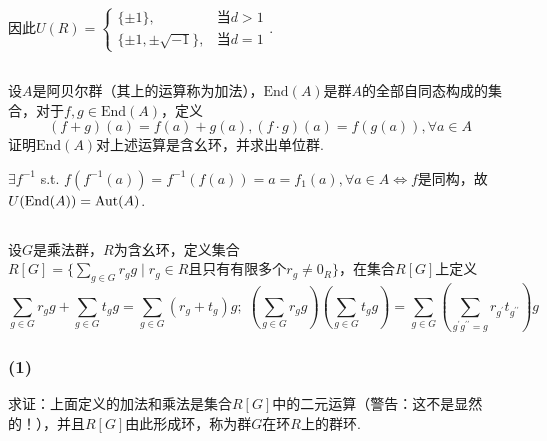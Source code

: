 因此$U(R)=
\begin{cases}
\{\pm 1\}, & \text{当}d>1\\
\{\pm 1, \pm\sqrt{-1}\}, & \text{当}d=1
\end{cases}$.

\subsection{}
设$A$是阿贝尔群（其上的运算称为加法），$\mathrm{End}(A)$是群$A$的全部自同态构成的集合，对于$f,g\in\mathrm{End}(A)$，定义
$$(f+g)(a)=f(a)+g(a), (f\cdot g)(a)=f(g(a)), \forall a\in A$$
证明$\mathrm{End}(A)$对上述运算是含幺环，并求出单位群.


\jie $\exists f^{-1}$ s.t. $f(f^{-1}(a))=f^{-1}(f(a))=a=f_1(a), \forall a\in A\Leftrightarrow
f$是同构，故$U(\mathrm{End}(A))=\operatorname{Aut}(A)$.

\subsection{}
设$G$是乘法群，$R$为含幺环，定义集合$R[G]=\{\sum_{g\in G}r_gg\mid r_g\in R\text{且只有有限多个}r_g\neq 0_R\}$，在集合$R[G]$上定义
$$\sum_{g\in G}r_gg+\sum_{g\in G}t_gg=\sum_{g\in G}(r_g+t_g)g;\;
\left(\sum_{g\in G}r_gg\right)\left(\sum_{g\in G}t_gg\right)=\sum_{g\in G}
\left(
\sum_{g^{\prime}g^{\prime\prime}=g}r_{g^{\prime}}t_{g^{\prime\prime}}
\right)g$$

\subsubsection{(1)}
求证：上面定义的加法和乘法是集合$R[G]$中的二元运算（警告：这不是显然的！），并且$R[G]$由此形成环，称为群$G$在环$R$上的{\heiti 群环}.

